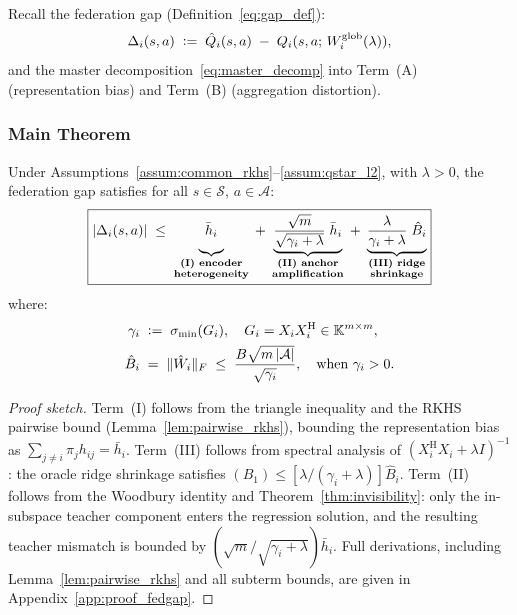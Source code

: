 Recall the federation gap
(Definition~\ref{eq:gap_def}):
\begin{equation}
    \Delta_i(s,a)
    \;\vcentcolon=\;
    \hat{Q}_i(s,a)
    \;-\;
    Q_i(s,a;\,W^{\mathrm{glob}}_i(\lambda)),
\end{equation}
and the master decomposition~\eqref{eq:master_decomp}
into Term~(A) (representation bias) and
Term~(B) (aggregation distortion).

\subsubsection{Main Theorem}

\begin{theorem}
\label{thm:fed_gap_main}
Under
Assumptions~\ref{assum:common_rkhs}--\ref{assum:qstar_l2},
with $\lambda > 0$, the federation gap satisfies for all
$s\in\mathcal{S}$, $a\in\mathcal{A}$:
\begin{equation}
\boxed{
    |\Delta_i(s,a)|
    \;\leq\;
    \underbrace{
    \bar{h}_i
    \vphantom{\frac{\sqrt{m}}{\sqrt{\gamma_i+\lambda}}}
    }_{\substack{\textbf{(I) encoder}\\\textbf{heterogeneity}}}
    \;+\;
    \underbrace{
    \frac{\sqrt{m}}
    {\sqrt{\gamma_i + \lambda}}\;
    \bar{h}_i
    }_{\substack{\textbf{(II) anchor}\\\textbf{amplification}}}
    \;+\;
    \underbrace{
    \frac{\lambda}
    {\gamma_i + \lambda}\;
    \hat{B}_i
    \vphantom{\frac{\sqrt{m}}{\sqrt{\gamma_i+\lambda}}}
    }_{\substack{\textbf{(III) ridge}\\\textbf{shrinkage}}}
}
\label{eq:gap_design}
\end{equation}
where:
\begin{align}
    \gamma_i
    &\;\vcentcolon=\;
    \sigma_{\min}(G_i),
    \quad
    G_i = X_i X_i^{\mathrm{H}}
    \in \mathbb{K}^{m \times m},
    \label{eq:gamma_def}\\
    \hat{B}_i
    &\;=\; \|\hat{W}_i\|_F
    \;\leq\;
    \frac{B\sqrt{m\,|\mathcal{A}|}}
    {\sqrt{\gamma_i}},
    \quad\text{when $\gamma_i > 0$}.
    \label{eq:Bhat_def}
\end{align}
\end{theorem}

\begin{proof}[Proof sketch]
Term~(I) follows from the triangle inequality and the RKHS pairwise bound
(Lemma~\ref{lem:pairwise_rkhs}), bounding the representation bias
as $\sum_{j\neq i}\pi_j h_{ij} = \bar{h}_i$.
Term~(III) follows from spectral analysis of
$(X_i^{\mathrm{H}} X_i + \lambda I)^{-1}$:
the oracle ridge shrinkage satisfies $(B_1) \leq [\lambda/(\gamma_i+\lambda)]\hat{B}_i$.
Term~(II) follows from the Woodbury identity and
Theorem~\ref{thm:invisibility}: only the in-subspace teacher component
enters the regression solution, and the resulting teacher mismatch is
bounded by $(\sqrt{m}/\sqrt{\gamma_i+\lambda})\bar{h}_i$.
Full derivations, including Lemma~\ref{lem:pairwise_rkhs} and all subterm bounds,
are given in Appendix~\ref{app:proof_fedgap}.
\end{proof}

